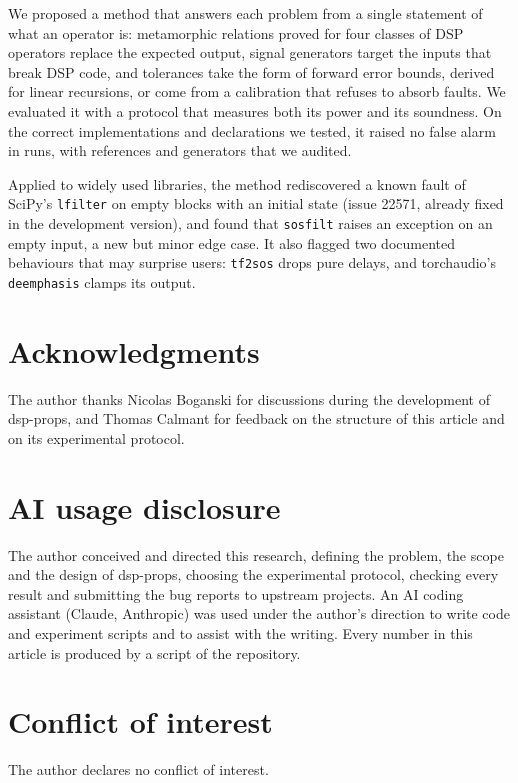 \documentclass[10pt,conference]{IEEEtran}
\newcommand{\code}[1]{\texttt{#1}}
\begin{document}
We proposed a method that answers each problem from a single statement of what
an operator is: metamorphic relations proved for four classes of DSP operators
replace the expected output, signal generators target the inputs that break DSP
code, and tolerances take the form of forward error bounds, derived for linear
recursions, or come from a calibration that refuses to absorb faults. We evaluated it with a protocol that measures both its power
and its soundness. \conclusionResult{} On the correct implementations and
declarations we tested, it raised no false alarm in \fpRuns{} runs, with
references and generators that we audited.

Applied to widely used libraries, the method rediscovered a known fault of
SciPy's \code{lfilter} on empty blocks with an initial state (issue 22571,
already fixed in the development version), and found that \code{sosfilt}
raises an exception on an empty input, a new but minor edge case. It also
flagged two documented behaviours that may surprise users: \code{tf2sos} drops
pure delays, and torchaudio's \code{deemphasis} clamps its output.
\reportedUpstream

\section*{Acknowledgments}
The author thanks Nicolas Boganski for discussions during the development of
dsp-props, and Thomas Calmant for feedback on the structure of this article
and on its experimental protocol.

\section*{AI usage disclosure}
The author conceived and directed this research, defining the problem, the
scope and the design of dsp-props, choosing the experimental protocol, checking
every result and submitting the bug reports to upstream projects. An AI coding
assistant (Claude, Anthropic) was used under the author's direction to write code and
experiment scripts and to assist with the writing. Every number in this article
is produced by a script of the repository.

\section*{Conflict of interest}
The author declares no conflict of interest.
\end{document}
